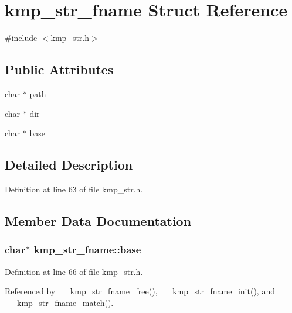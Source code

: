 \hypertarget{structkmp__str__fname}{\section{kmp\-\_\-str\-\_\-fname Struct Reference}
\label{structkmp__str__fname}
}


{\ttfamily \#include $<$kmp\-\_\-str.\-h$>$}

\subsection*{Public Attributes}
\begin{DoxyCompactItemize}
\item 
char $\ast$ \hyperlink{structkmp__str__fname_a513f711d0851cc50629dbd7bcd9b4ccd}{path}
\item 
char $\ast$ \hyperlink{structkmp__str__fname_a5f67b7b74f3c8ee34b6a9cc6b2fc9e91}{dir}
\item 
char $\ast$ \hyperlink{structkmp__str__fname_a1a36034cd5e0ae79404d0f0d05c3ae69}{base}
\end{DoxyCompactItemize}


\subsection{Detailed Description}


Definition at line 63 of file kmp\-\_\-str.\-h.



\subsection{Member Data Documentation}
\hypertarget{structkmp__str__fname_a1a36034cd5e0ae79404d0f0d05c3ae69}{
\subsubsection[{base}]{\setlength{\rightskip}{0pt plus 5cm}char$\ast$ kmp\-\_\-str\-\_\-fname\-::base}}\label{structkmp__str__fname_a1a36034cd5e0ae79404d0f0d05c3ae69}


Definition at line 66 of file kmp\-\_\-str.\-h.



Referenced by \-\_\-\-\_\-kmp\-\_\-str\-\_\-fname\-\_\-free(), \-\_\-\-\_\-kmp\-\_\-str\-\_\-fname\-\_\-init(), and \-\_\-\-\_\-kmp\-\_\-str\-\_\-fname\-\_\-match().

